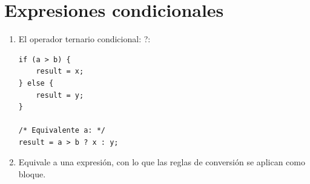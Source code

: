 \documentclass[a4paper,oneside]{article}
\begin{document}
\section{Expresiones condicionales}
  \begin{enumerate}
  \item El operador ternario condicional: ?:

    \begin{verbatim}
if (a > b) {
    result = x;
} else {
    result = y;
}

/* Equivalente a: */
result = a > b ? x : y;
    \end{verbatim}
  \item Equivale a una expresión, con lo que las reglas de conversión se aplican como bloque.
  \end{enumerate}

\newpage
\end{document}
